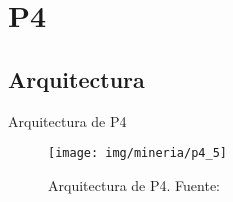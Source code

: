 \documentclass[10pt]{beamer}
\newcommand{\1}{
	\setbeamertemplate{background}{
		\texttt{[image: img/1]}
		\tikz[overlay] \fill[fill opacity=0.75,fill=white] (0,0) rectangle (-\paperwidth,\paperheight);
	}
}
\begin{document}


\section{P4}

\subsection{Arquitectura}


\begin{frame}{Arquitectura de P4}
\begin{figure}[]
	\centering
	\texttt{[image: img/mineria/p4\_5]}
	\caption{Arquitectura de P4. Fuente: \cite{li2018p4}}
\end{figure}	
\end{frame}
\end{document}
